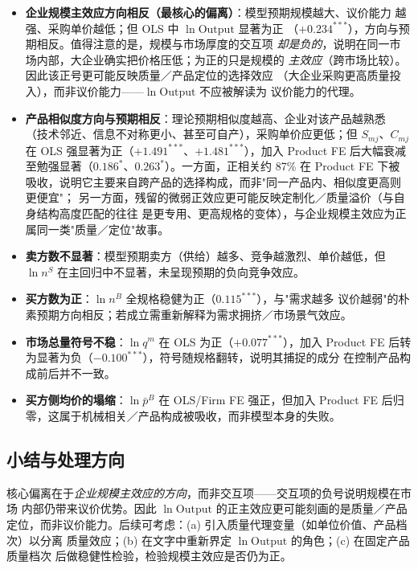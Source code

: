 \documentclass[12pt]{article}
\begin{document}
\begin{itemize}[nosep]
  \item \textbf{企业规模主效应方向相反（最核心的偏离）}：模型预期规模越大、议价能力
    越强、采购单价越低；但 OLS 中 $\ln\mathrm{Output}$ 显著为正
    （$+0.234^{***}$），方向与预期相反。值得注意的是，规模与市场厚度的交互项
    \emph{却是负的}，说明在同一市场内部，大企业确实把价格压低；为正的只是规模的
    \emph{主效应}（跨市场比较）。因此该正号更可能反映质量／产品定位的选择效应
    （大企业采购更高质量投入），而非议价能力——$\ln\mathrm{Output}$ 不应被解读为
    议价能力的代理。
  \item \textbf{产品相似度方向与预期相反}：理论预期相似度越高、企业对该产品越熟悉
    （技术邻近、信息不对称更小、甚至可自产），采购单价应更低；但 $S_{mj}$、$C_{mj}$
    在 OLS 强显著为正（$+1.491^{***}$、$+1.481^{***}$），加入 Product FE 后大幅衰减
    至勉强显著（$0.186^{*}$、$0.263^{*}$）。一方面，正相关约 87\% 在 Product FE 下被
    吸收，说明它主要来自跨产品的选择构成，而非"同一产品内、相似度更高则更便宜"；
    另一方面，残留的微弱正效应更可能反映定制化／质量溢价（与自身结构高度匹配的往往
    是更专用、更高规格的变体），与企业规模主效应为正属同一类"质量／定位"故事。
  \item \textbf{卖方数不显著}：模型预期卖方（供给）越多、竞争越激烈、单价越低，但
    $\ln n^S$ 在主回归中不显著，未呈现预期的负向竞争效应。
  \item \textbf{买方数为正}：$\ln n^B$ 全规格稳健为正（$0.115^{***}$），与"需求越多
    议价越弱"的朴素预期方向相反；若成立需重新解释为需求拥挤／市场景气效应。
  \item \textbf{市场总量符号不稳}：$\ln q^m$ 在 OLS 为正（$+0.077^{***}$），加入
    Product FE 后转为显著为负（$-0.100^{***}$），符号随规格翻转，说明其捕捉的成分
    在控制产品构成前后并不一致。
  \item \textbf{买方侧均价的塌缩}：$\ln\bar{p}^{B}$ 在 OLS/Firm FE 强正，但加入
    Product FE 后归零，这属于机械相关／产品构成被吸收，而非模型本身的失败。
\end{itemize}

\subsection*{小结与处理方向}

核心偏离在于\emph{企业规模主效应的方向}，而非交互项——交互项的负号说明规模在市场
内部仍带来议价优势。因此 $\ln\mathrm{Output}$ 的正主效应更可能刻画的是质量／产品
定位，而非议价能力。后续可考虑：(a) 引入质量代理变量（如单位价值、产品档次）以分离
质量效应；(b) 在文字中重新界定 $\ln\mathrm{Output}$ 的角色；(c) 在固定产品质量档次
后做稳健性检验，检验规模主效应是否仍为正。
\end{document}
